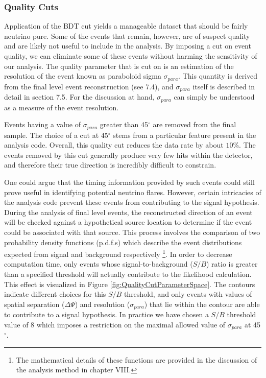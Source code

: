 \documentclass{gatech-thesis}
\begin{document}
\subsubsection{Quality Cuts}
Application of the BDT cut yields a manageable dataset that should be fairly neutrino pure. Some of the events that remain, however, are of suspect quality and are likely not useful to include in the analysis. By imposing a cut on event quality, we can eliminate some of these events without harming the sensitivity of our analysis. The quality parameter that is cut on is an estimation of the resolution of the event known as paraboloid sigma $\sigma_{para}$. This quantity is derived from the final level event reconstruction (see 7.4), and $\sigma_{para}$ itself is described in detail in section 7.5. For the discussion at hand, $\sigma_{para}$ can simply be understood as a measure of the event resolution.

Events having a value of $\sigma_{para}$ greater than 45$^{\circ}$ are removed from the final sample. The choice of a cut at 45$^{\circ}$ stems from a particular feature present in the analysis code. Overall, this quality cut reduces the data rate by about $10\%$. The events removed by this cut generally produce very few hits within the detector, and therefore their true direction is incredibly difficult to constrain.

One could argue that the timing information provided by such events could still prove useful in identifying potential neutrino flares. However, certain intricacies of the analysis code prevent these events from contributing to the signal hypothesis. During the analysis of final level events, the reconstructed direction of an event will be checked against a hypothetical source location to determine if the event could be associated with that source. This process involves the comparison of two probability density functions (p.d.f.s) which describe the event distributions expected from signal and background respectively \footnote{The mathematical details of these functions are provided in the discussion of the analysis method in chapter VIII.}. In order to decrease computation time, only events whose signal-to-background ($S/B$) ratio is greater than a specified threshold will actually contribute to the likelihood calculation. This effect is visualized in Figure \ref{fig:QualityCutParameterSpace}. The contours indicate different choices for this $S/B$ threshold, and only events with values of spatial separation ($\Delta \Psi$) and resolution ($\sigma_{para}$) that lie within the contour are able to contribute to a signal hypothesis. In practice we have chosen a $S/B$ threshold value of 8 which imposes a restriction on the maximal allowed value of $\sigma_{para}$ at 45$^{\circ}$.
\end{document}
